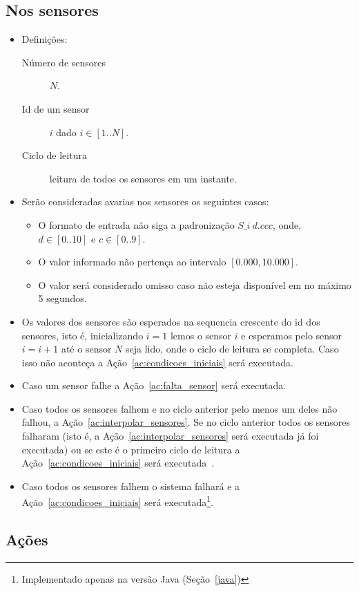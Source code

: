 \documentclass[a4paper,10pt]{article}
\begin{document}
\subsection{Nos sensores}\label{sec:av_sensor}
\begin{itemize}
	\item Definições:
		\begin{description}
			\item[Número de sensores] $N$.
			\item[Id de um sensor] $i$ dado $i\in[1..N]$.
			\item[Ciclo de leitura] leitura de todos os sensores em um instante.
		\end{description}
	\item Serão consideradas avarias nos sensores os seguintes casos:
	\begin{itemize}
		\item O formato de entrada não siga a padronização $S\_i~d.ccc$,
			onde, $d\in[0..10]$ e $c\in[0..9]$.
		\item O valor informado não pertença ao intervalo
			$[0.000,10.000]$.
		\item O valor será considerado omisso caso não esteja disponível em no máximo
			5 segundos.
	\end{itemize}
	\item Os valores dos sensores são esperados na sequencia crescente do id
		dos sensores, isto é, inicializando $i=1$ lemos o sensor $i$ e esperamos
		pelo sensor $i=i+1$ até o sensor $N$ seja lido, onde o ciclo de leitura
		se completa.
		Caso isso não aconteça a Ação~\ref{ac:condicoes_iniciais} será
		executada.
	\item Caso um sensor falhe a Ação~\ref{ac:falta_sensor} será executada.
	\item Caso todos os sensores falhem e no ciclo anterior pelo menos um deles
		não falhou, a Ação~\ref{ac:interpolar_sensores}. Se no ciclo anterior
		todos os sensores falharam (isto é, a Ação~\ref{ac:interpolar_sensores}
		será executada já foi executada) ou se este é o primeiro ciclo de
		leitura a Ação~\ref{ac:condicoes_iniciais} será
		executada~.
	\item Caso todos os sensores falhem o sistema falhará e a
		Ação~\ref{ac:condicoes_iniciais} será executada\footnote{Implementado
		apenas na versão Java (Seção~\ref{java})\label{ft:java}}.
\end{itemize}

\subsection{Ações}
\end{document}
